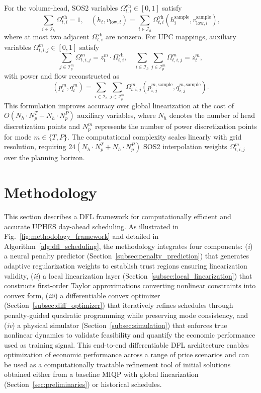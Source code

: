 \documentclass[journal]{IEEEtran}
\begin{document}
For the volume-head, SOS2 variables $\Omega_{t,i}^{\text{vh}} \in [0,1]$ satisfy
\begin{equation}
\sum_{i \in \mathcal{I}_h} \Omega_{t,i}^{\text{vh}} = 1, \quad
(h_t, v_{\text{low},t}) = \sum_{i \in \mathcal{I}_h} \Omega_{t,i}^{\text{vh}} (h_i^{\text{sample}}, v_{\text{low},i}^{\text{sample}}),
\label{eq:sos2_vh}
\end{equation}
where at most two adjacent $\Omega_{t,i}^{\text{vh}}$ are nonzero. For UPC mappings, auxiliary variables $\Omega_{t,i,j}^m \in [0,1]$ satisfy
\begin{equation}
\sum_{j \in \mathcal{I}_p^m} \Omega_{t,i,j}^m = z_t^m \cdot \Omega_{t,i}^{\text{vh}}, \quad
\sum_{i \in \mathcal{I}_h}\sum_{j \in \mathcal{I}_p^m} \Omega_{t,i,j}^m = z_t^m,
\label{eq:sos2_mode}
\end{equation}
with power and flow reconstructed as
\begin{equation}
(p_t^m, q_t^m) = \sum_{i \in \mathcal{I}_h}\sum_{j \in \mathcal{I}_p^m} \Omega_{t,i,j}^m (p_{i,j}^{m,{\text{sample}}}, q_{i,j}^{m,{\text{sample}}}).
\label{eq:sos2_power_flow}
\end{equation}
This formulation improves accuracy over global linearization at the cost of $O(N_h \cdot N_p^T + N_h \cdot N_p^P)$ auxiliary variables, where $N_h$ denotes the number of head discretization points and $N_p^m$ represents the number of power discretization points for mode $m \in \{T, P\}$. The computational complexity scales linearly with grid resolution, requiring $24(N_h \cdot N_p^T + N_h \cdot N_p^P)$ SOS2 interpolation weights $\Omega_{t,i,j}^m$ over the planning horizon.

\section{Methodology}
\label{sec:methodology}

This section describes a DFL framework for computationally efficient and accurate UPHES day-ahead scheduling. As illustrated in Fig.~\ref{fig:methodology_framework} and detailed in Algorithm~\ref{alg:dfl_scheduling}, the methodology integrates four components: (\textit{i}) a neural penalty predictor (Section~\ref{subsec:penalty_prediction}) that generates adaptive regularization weights to establish trust regions ensuring linearization validity, (\textit{ii}) a local linearization layer (Section~\ref{subsec:local_linearization}) that constructs first-order Taylor approximations converting nonlinear constraints into convex form, (\textit{iii}) a differentiable convex optimizer (Section~\ref{subsec:diff_optimizer}) that iteratively refines schedules through penalty-guided quadratic programming while preserving mode consistency, and (\textit{iv}) a physical simulator (Section~\ref{subsec:simulation}) that enforces true nonlinear dynamics to validate feasibility and quantify the economic performance used as training signal. 
This end-to-end differentiable DFL architecture enables optimization of economic performance across a range of price scenarios and can be used as a computationally tractable refinement tool of initial solutions obtained either from a baseline MIQP with global linearization (Section~\ref{sec:preliminaries}) or historical schedules.
\end{document}
